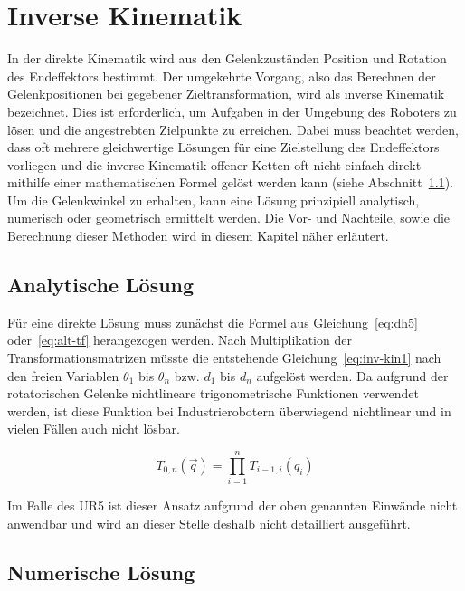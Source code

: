 \cleardoublepage


\chapter{Inverse Kinematik}\label{ch:inverse-kinematik}

In der direkte Kinematik wird aus den Gelenkzuständen Position und Rotation des Endeffektors bestimmt.
Der umgekehrte Vorgang, also das Berechnen der Gelenkpositionen bei gegebener Zieltransformation, wird als inverse Kinematik bezeichnet.
Dies ist erforderlich, um Aufgaben in der Umgebung des Roboters zu lösen und die angestrebten Zielpunkte zu erreichen.
Dabei muss beachtet werden, dass oft mehrere gleichwertige Lösungen für eine Zielstellung des Endeffektors vorliegen und die inverse Kinematik offener Ketten oft nicht einfach direkt mithilfe einer mathematischen Formel gelöst werden kann (siehe Abschnitt~\ref{sec:analytische-losung}).
Um die Gelenkwinkel zu erhalten, kann eine Lösung prinzipiell analytisch, numerisch oder geometrisch ermittelt werden.
Die Vor- und Nachteile, sowie die Berechnung dieser Methoden wird in diesem Kapitel näher erläutert.


\section{Analytische Lösung}\label{sec:analytische-losung}

Für eine direkte Lösung muss zunächst die Formel aus Gleichung~\ref{eq:dh5} oder~\ref{eq:alt-tf} herangezogen werden.
Nach Multiplikation der Transformationsmatrizen müsste die entstehende Gleichung~\ref{eq:inv-kin1} nach den freien Variablen $\theta_1$ bis $\theta_n$ bzw. $d_1$ bis $d_n$ aufgelöst werden.
Da aufgrund der rotatorischen Gelenke nichtlineare trigonometrische Funktionen verwendet werden, ist diese Funktion bei Industrierobotern überwiegend nichtlinear und in vielen Fällen auch nicht lösbar.

\begin{equation}
    T_{0,n}(\overrightarrow{q}) = \prod_{i=1}^{n} T_{i-1,i}(q_i)     \label{eq:inv-kin1}
\end{equation}

Im Falle des UR5 ist dieser Ansatz aufgrund der oben genannten Einwände nicht anwendbar und wird an dieser Stelle deshalb nicht detailliert ausgeführt.


\section{Numerische Lösung}

